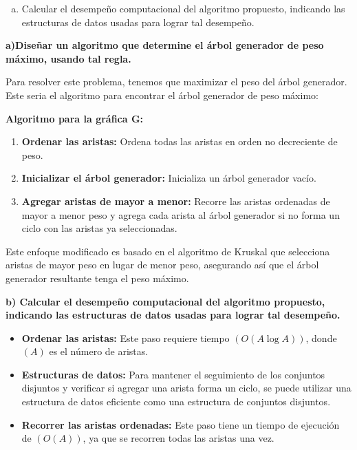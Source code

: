 \documentclass[answers, 11pt]{exam}
\begin{document}
\begin{questions}
{\begin{enumerate}[a)]
    \item Calcular el desempeño computacional del algoritmo propuesto, indicando 
    las estructuras de datos usadas para lograr tal desempeño.
  \end{enumerate}}

  \begin{solution}
    \textbf{a)Diseñar un algoritmo que determine el árbol generador de peso
    máximo, usando tal regla.}

    Para resolver este problema, tenemos que maximizar el peso del árbol generador. Este seria el algoritmo para encontrar el árbol generador de peso máximo:

    \textbf{Algoritmo para la gráfica G:}
    \begin{enumerate}[1.]
      \item \textbf{Ordenar las aristas:} Ordena todas las aristas en orden no decreciente de peso.
      \item \textbf{Inicializar el árbol generador:} Inicializa un árbol generador vacío.
      \item \textbf{Agregar aristas de mayor a menor:} Recorre las aristas ordenadas de mayor a menor 
      peso y agrega cada arista al árbol generador si no forma un ciclo con las aristas 
      ya seleccionadas.
    \end{enumerate}

    Este enfoque modificado es basado en el algoritmo de Kruskal que selecciona aristas de mayor peso en lugar de menor peso, asegurando así que el árbol generador resultante tenga el peso máximo.

    \textbf{b) Calcular el desempeño computacional del algoritmo propuesto, indicando 
    las estructuras de datos usadas para lograr tal desempeño.}

    \begin{itemize}
        \item \textbf{Ordenar las aristas:} Este paso requiere tiempo $(O(A \log A))$, donde $(A)$ es el número de aristas.
  
        \item \textbf{Estructuras de datos:} Para mantener el seguimiento de los conjuntos disjuntos y verificar si agregar una arista forma un ciclo, se puede utilizar una estructura de datos eficiente como una estructura de conjuntos disjuntos.

        \item \textbf{Recorrer las aristas ordenadas:} Este paso tiene un tiempo de ejecución de $(O(A))$, ya que se recorren todas las aristas una vez.


\end{itemize}
\end{solution}
\end{questions}
\end{document}
